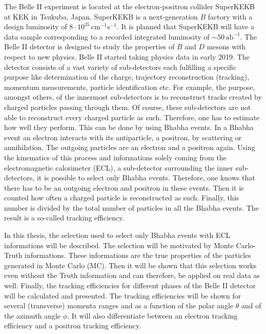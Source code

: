 \documentclass[a4paper,11pt,twosided,final,german,openbib,pdftex,listof=totoc,bibliography=totoc]{scrbook}
\begin{document}
The Belle II experiment is located at the electron-positron collider SuperKEKB at KEK in Tsukuba, Japan. SuperKEKB is a next-generation $B$ factory with a design luminosity of $8\cdot 10^{35}\,\textrm{cm}^{-1}\textrm{s}^{-1}$. It is planned that SuperKEKB will have a data sample corresponding to a recorded integrated luminosity of $\sim 50\,\textrm{ab}^{-1}$. 
The Belle II detector is designed to study the properties of $B$ and $D$ mesons with respect to new physics. Belle II started taking physics data in early 2019. 
The detector consists of a vast variety of sub-detectors each fulfilling a specific purpose like determination of the charge, trajectory reconstruction (tracking), momentum measurements, particle identification etc. For example, the purpose, amongst others, of the innermost sub-detectors is to reconstruct tracks created by charged particles passing through them. Of course, these sub-detectors are not able to reconstruct every charged particle as such. Therefore, one has to estimate how well they perform. This can be done by using Bhabha events. 
In a Bhabha event an electron interacts with its antiparticle, a positron, by scattering or annihilation. The outgoing particles are an electron and a positron again. Using the kinematics of this process and informations solely coming from the electromagnetic calorimeter (ECL), a sub-detector surrounding the inner sub-detectors, it is possible to select only Bhabha events. Therefore, one knows that there has to be an outgoing electron and positron in these events. Then it is counted how often a charged particle is reconstructed as such. Finally, this number is divided by the total number of particles in all the Bhabha events. The result is a so-called tracking efficiency.
\newline


In this thesis, the selection used to select only Bhabha events with ECL informations will be described. The selection will be motivated by Monte Carlo-Truth informations. These informations are the true properties of the particles generated in Monte Carlo (MC). Then it will be shown that this selection works even without the Truth information and can therefore, be applied on real data as well. Finally, the tracking efficiencies for different phases of the Belle II detector will be calculated and presented. The tracking efficiencies will be shown for several (transverse) momenta ranges and as a function of the polar angle $\theta$ and of the azimuth angle $\phi$. It will also differentiate between an electron tracking efficiency and a positron tracking efficiency.
\newline
\end{document}
